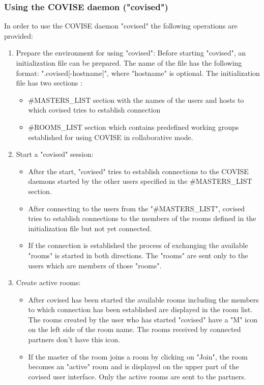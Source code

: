 \subsubsection{Using the COVISE daemon ("covised")}

In order to use the COVISE daemon "covised" the following operations are provided:
   
\begin{enumerate}

\item Prepare the environment for using "covised":\newline
      Before starting "covised", an initialization file can be prepared. 
      The name of the file has the following format: ".covised[-hostname]",
      where "hostname" is optional.\newline
      The initialization file has two sections :
      	\begin{itemize}
        	\item 	\#MASTERS\_LIST section with the names of the users and
        		hosts to which covised tries to establish connection
         	\item   \#ROOMS\_LIST section which contains predefined
        		working groups established for using COVISE in collaborative mode.
	\end{itemize}
	
\item Start a "covised" session:
        \begin{itemize}
		\item 	After the start, "covised" tries to establish connections to the
        		COVISE daemons started by the other users specified in the \#MASTERS\_LIST section.
        	\item 	After connecting to the users from the "\#MASTERS\_LIST", covised
        		tries to establish connections to the members of the rooms defined in the
        		initialization file but not yet connected.
        	\item	If the connection is established the process of exchanging the available
        		"rooms" is started in both directions. The "rooms" are sent only to
        		the users which are members of those "rooms".
	\end{itemize}

\item   Create active rooms:
        \begin{itemize}
		\item 	After covised has been started the available rooms including the members 
			to which connection has been established are displayed in the
        		room list. The rooms created by the user who has started "covised"
        	 	have a "M" icon on the left side of the room name. The rooms received
        		by connected partners don't have this icon.
        	\item  	If the master of the room joins a room by clicking on "Join",
        		the room becomes an "active" room and is displayed on the
        		upper part of the covised user interface. Only the active rooms are
        		sent to the partners.
	\end{itemize}


\end{enumerate}
